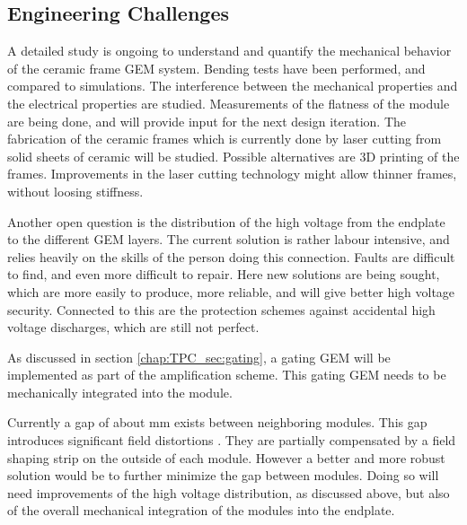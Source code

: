 \subsection{Engineering Challenges}
A detailed study is ongoing to understand and quantify the mechanical behavior of the ceramic frame GEM system. Bending tests have been performed, and compared to simulations. The interference between the mechanical properties and the electrical properties are studied. Measurements of the flatness of the module are being done, and will provide input for the next design iteration.
The fabrication of the ceramic frames which is currently done by laser cutting from solid sheets of ceramic will be studied. Possible alternatives are 3D printing of the frames. Improvements in the laser cutting technology might allow thinner frames, without loosing stiffness.

Another open question is the distribution of the high voltage from the endplate to the different GEM layers. The current solution is rather labour intensive, and relies heavily on the skills of the person doing this connection. Faults are difficult to find, and even more difficult to repair. Here new solutions are being sought, which are more easily to produce, more reliable, and will give better high voltage security. Connected to this are the protection schemes against accidental high voltage discharges, which are still not perfect.

As discussed in section \ref{chap:TPC_sec:gating}, a gating GEM will be implemented as part of the amplification scheme. This gating GEM needs to be mechanically integrated into the module.

Currently a gap of about \unit[2]{mm} exists between neighboring modules. This gap introduces significant field distortions \cite{Zenker:2014qra}. They are partially compensated by a field shaping strip on the outside of each module. However a better and more robust solution would be to further minimize the gap between modules. Doing so will need improvements of the high voltage distribution, as discussed above, but also of the overall mechanical integration of the modules into the endplate.

